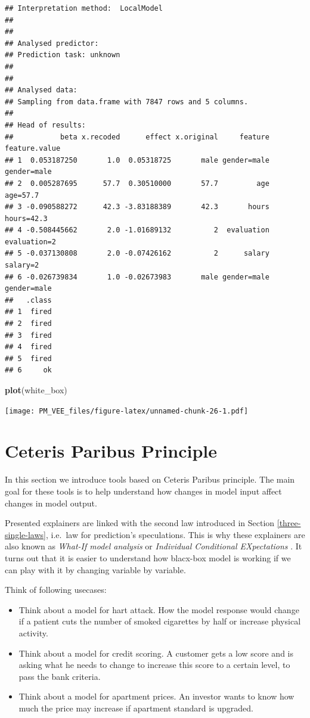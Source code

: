 \documentclass[]{book}
\newenvironment{Shaded}{\begin{snugshade}}{\end{snugshade}}
\newcommand{\KeywordTok}[1]{\textcolor[rgb]{0.13,0.29,0.53}{\textbf{#1}}}
\newcommand{\NormalTok}[1]{#1}
\providecommand{\tightlist}{%
  \setlength{\itemsep}{0pt}\setlength{\parskip}{0pt}}
\theoremstyle{definition}
\theoremstyle{definition}
\theoremstyle{definition}
\theoremstyle{remark}
\begin{document}
\begin{verbatim}
## Interpretation method:  LocalModel 
## 
## 
## Analysed predictor: 
## Prediction task: unknown 
## 
## 
## Analysed data:
## Sampling from data.frame with 7847 rows and 5 columns.
## 
## Head of results:
##           beta x.recoded      effect x.original     feature feature.value
## 1  0.053187250       1.0  0.05318725       male gender=male   gender=male
## 2  0.005287695      57.7  0.30510000       57.7         age      age=57.7
## 3 -0.090588272      42.3 -3.83188389       42.3       hours    hours=42.3
## 4 -0.508445662       2.0 -1.01689132          2  evaluation  evaluation=2
## 5 -0.037130808       2.0 -0.07426162          2      salary      salary=2
## 6 -0.026739834       1.0 -0.02673983       male gender=male   gender=male
##   .class
## 1  fired
## 2  fired
## 3  fired
## 4  fired
## 5  fired
## 6     ok
\end{verbatim}

\begin{Shaded}
\begin{Highlighting}[]
\KeywordTok{plot}\NormalTok{(white_box)}
\end{Highlighting}
\end{Shaded}

\texttt{[image: PM\_VEE\_files/figure-latex/unnamed-chunk-26-1.pdf]}

\hypertarget{ceterisParibus}{%
\chapter{Ceteris Paribus Principle}\label{ceterisParibus}}

In this section we introduce tools based on Ceteris Paribus principle.
The main goal for these tools is to help understand how changes in model
input affect changes in model output.

Presented explainers are linked with the second law introduced in
Section \ref{three-single-laws}, i.e.~law for prediction's speculations.
This is why these explainers are also known as \emph{What-If model
analysis} or \emph{Individual Conditional EXpectations} \citep{ICEbox}.
It turns out that it is easier to understand how blacx-box model is
working if we can play with it by changing variable by variable.

Think of following usecases:

\begin{itemize}
\tightlist
\item
  Think about a model for hart attack. How the model response would
  change if a patient cuts the number of smoked cigarettes by half or
  increase physical activity.
\item
  Think about a model for credit scoring. A customer gets a low score
  and is asking what he needs to change to increase this score to a
  certain level, to pass the bank criteria.
\item
  Think about a model for apartment prices. An investor wants to know
  how much the price may increase if apartment standard is upgraded.
\end{itemize}
\end{document}
